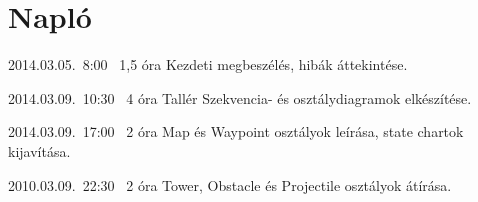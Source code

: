 %
\section{Napló}

\begin{naplo}


\bejegyzes
{2014.03.05.~8:00~} %
{1,5 óra} %
{\vadam\newline
\vantal\newline
\vbator\newline
\vtorok} %
{Kezdeti megbeszélés, hibák áttekintése.} %

\bejegyzes
{2014.03.09.~10:30~} %
{4 óra} %
{Tallér} %
{Szekvencia- és osztálydiagramok elkészítése.}

\bejegyzes
{2014.03.09.~17:00~}
{2 óra}
{\vadam}
{Map és Waypoint osztályok leírása, state chartok kijavítása.}

\bejegyzes
{2010.03.09.~22:30~}
{2 óra}
{\vadam}
{Tower, Obstacle és Projectile osztályok átírása.}



\end{naplo}

